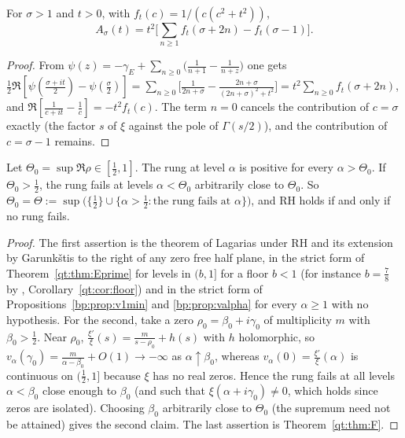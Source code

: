 \begin{lemma}\label{mq:lem:arch}
For $\sigma>1$ and $t>0$, with $f_t(c)=1/(c(c^2+t^2))$,
\[
A_\sigma(t)=t^2\Big[\sum_{n\ge1}f_t(\sigma+2n)-f_t(\sigma-1)\Big].
\]
\end{lemma}

\begin{proof}
From $\psi(z)=-\gamma_E+\sum_{n\ge0}\big(\frac1{n+1}-\frac1{n+z}\big)$ one gets $\frac12\Re[\psi(\frac{\sigma+it}2)-\psi(\frac\sigma2)]=\sum_{n\ge0}\big[\frac1{2n+\sigma}-\frac{2n+\sigma}{(2n+\sigma)^2+t^2}\big]=t^2\sum_{n\ge0}f_t(\sigma+2n)$, and $\Re[\frac1{c+it}-\frac1c]=-t^2f_t(c)$. The term $n=0$ cancels the contribution of $c=\sigma$ exactly (the factor $s$ of $\xi$ against the pole of $\Gamma(s/2)$), and the contribution of $c=\sigma-1$ remains.
\end{proof}

\begin{proposition}\label{mq:prop:firstrung}
Let $\Theta_0=\sup\Re\rho\in[\frac12,1]$. The rung at level $\alpha$ is positive for every $\alpha>\Theta_0$. If $\Theta_0>\frac12$, the rung fails at levels $\alpha<\Theta_0$ arbitrarily close to $\Theta_0$. So $\Theta_0=\Theta:=\sup\big(\{\frac12\}\cup\{\alpha>\frac12:\text{the rung fails at }\alpha\}\big)$, and RH holds if and only if no rung fails.
\end{proposition}

\begin{proof}
The first assertion is the theorem of Lagarias \cite{Lagarias} under RH and its extension by Garunk\v{s}tis \cite{Garunkstis02} to the right of any zero free half plane, in the strict form of Theorem~\ref{qt:thm:Eprime} for levels in $(b,1]$ for a floor $b<1$ (for instance $b=\frac78$ by \cite{OAI26a}, Corollary~\ref{qt:cor:floor}) and in the strict form of Propositions~\ref{bp:prop:v1min} and \ref{bp:prop:valpha} for every $\alpha\ge1$ with no hypothesis. For the second, take a zero $\rho_0=\beta_0+i\gamma_0$ of multiplicity $m$ with $\beta_0>\frac12$. Near $\rho_0$, $\frac{\xi'}\xi(s)=\frac m{s-\rho_0}+h(s)$ with $h$ holomorphic, so $v_\alpha(\gamma_0)=\frac m{\alpha-\beta_0}+O(1)\to-\infty$ as $\alpha\uparrow\beta_0$, whereas $v_\alpha(0)=\frac{\xi'}\xi(\alpha)$ is continuous on $(\frac12,1]$ because $\xi$ has no real zeros. Hence the rung fails at all levels $\alpha<\beta_0$ close enough to $\beta_0$ (and such that $\xi(\alpha+i\gamma_0)\ne0$, which holds since zeros are isolated). Choosing $\beta_0$ arbitrarily close to $\Theta_0$ (the supremum need not be attained) gives the second claim. The last assertion is Theorem~\ref{qt:thm:F}.
\end{proof}

